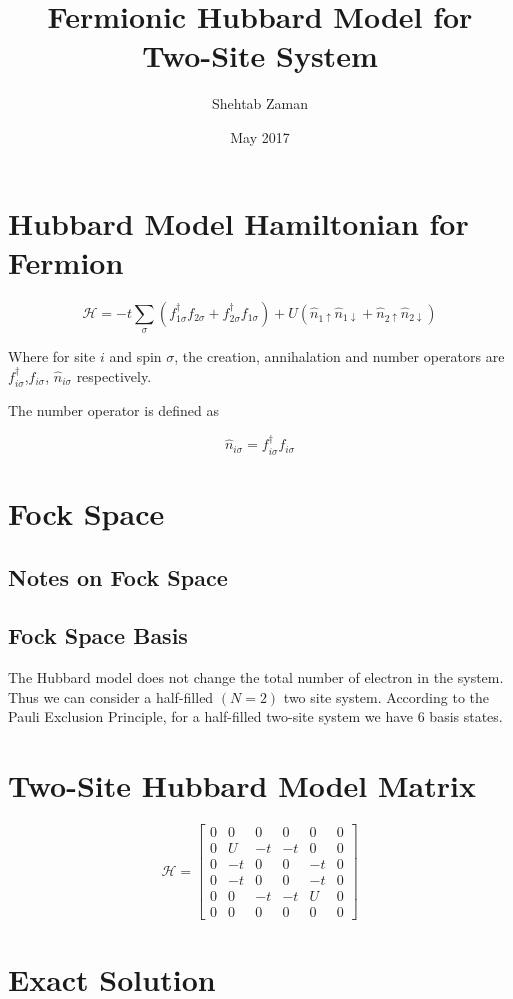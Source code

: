 \documentclass{article}
\title{Fermionic Hubbard Model for Two-Site System}
\author{Shehtab Zaman }
\date{May 2017}
\begin{document}
\maketitle
\section{Hubbard Model Hamiltonian for Fermion}

\begin{equation}
\mathcal{H} = -t\sum_{\sigma} \left(f_{1 \sigma} ^{\dagger}f_{2 \sigma}+f_{2 \sigma} ^{\dagger}f_{1 \sigma} \right)
+ U\left(\hat{n}_{1\uparrow} \hat{n}_{1\downarrow} + \hat{n}_{2\uparrow} \hat{n}_{2\downarrow} \right)
\end{equation}

Where for site $ i$ and spin $ \sigma$, the creation, annihalation and number
operators are $f_{i \sigma} ^{\dagger}$,$f_{i \sigma} $,
$ \hat{n}_{i\sigma}$  respectively.

The number operator is defined as

$$ \hat{n}_{i\sigma} = f_{i \sigma} ^{\dagger}f_{i \sigma}$$
\section{Fock Space}
\subsection{Notes on Fock Space}

\subsection{Fock Space Basis}
The Hubbard model does not change the total number of electron in the system. Thus we can consider
a half-filled $(N = 2)$ two site system. According to the Pauli Exclusion Principle, for a half-filled two-site system we
have 6 basis states.
\begin{center}

\end{center}
\section{Two-Site Hubbard Model Matrix}
\begin{equation}
  \mathcal{H} =
  \begin{bmatrix}
    0 & 0 & 0 & 0 & 0 & 0 \\
    0 & U & -t & -t & 0 & 0 \\
    0 & -t & 0 & 0 & -t & 0 \\
    0 & -t & 0 & 0 & -t & 0 \\
    0 & 0 & -t & -t & U & 0 \\
    0 & 0 & 0 & 0 & 0 & 0
  \end{bmatrix}
\end{equation}
\section{Exact Solution}
\end{document}
